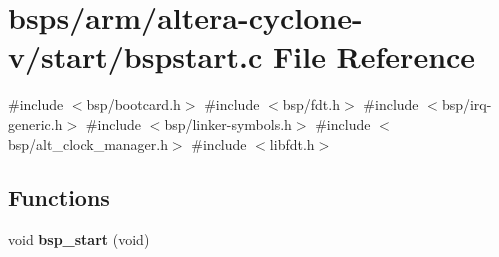 \hypertarget{arm_2altera-cyclone-v_2start_2bspstart_8c}{}\section{bsps/arm/altera-\/cyclone-\/v/start/bspstart.c File Reference}
\label{arm_2altera-cyclone-v_2start_2bspstart_8c}
{\ttfamily \#include $<$bsp/bootcard.\+h$>$}\newline
{\ttfamily \#include $<$bsp/fdt.\+h$>$}\newline
{\ttfamily \#include $<$bsp/irq-\/generic.\+h$>$}\newline
{\ttfamily \#include $<$bsp/linker-\/symbols.\+h$>$}\newline
{\ttfamily \#include $<$bsp/alt\+\_\+clock\+\_\+manager.\+h$>$}\newline
{\ttfamily \#include $<$libfdt.\+h$>$}\newline
\subsection*{Functions}
\begin{DoxyCompactItemize}
\item 
void {\bfseries bsp\+\_\+start} (void)
\end{DoxyCompactItemize}
